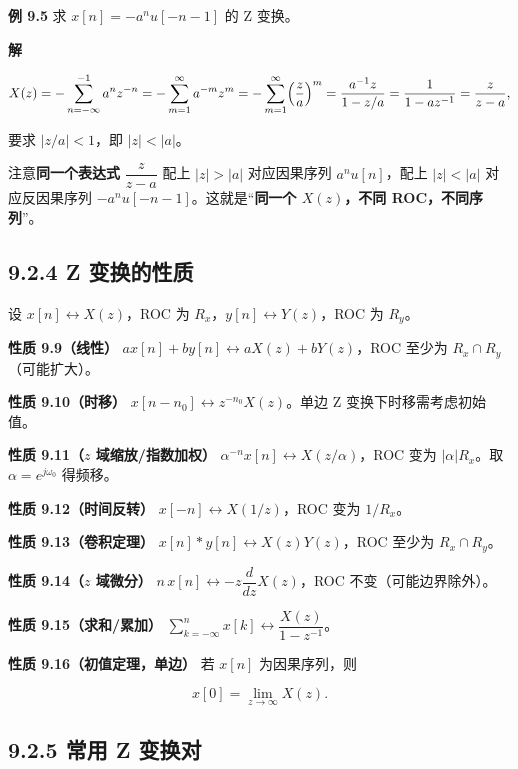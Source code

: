 \textbf{例 9.5} 求 \(x[n]=-a^n u[-n-1]\) 的 Z 变换。

\textbf{解}

\[
X(z)=-\sum_{n=-\infty}^{-1}a^n z^{-n}
=-\sum_{m=1}^{\infty} a^{-m}z^{m}
=-\sum_{m=1}^{\infty}\Bigl(\frac{z}{a}\Bigr)^{m}
= \frac{a^{-1}z}{1-z/a} = \frac{1}{1-a z^{-1}} =
\frac{z}{z-a},
\]

要求 \(|z/a|<1\)，即 \(|z|<|a|\)。

注意\textbf{同一个表达式} \(\dfrac{z}{z-a}\) 配上 \(|z|>|a|\)
对应因果序列 \(a^n u[n]\)，配上 \(|z|<|a|\) 对应反因果序列
\(-a^n u[-n-1]\)。这就是``\textbf{同一个 \(X(z)\)，不同
ROC，不同序列}''。

\subsection{9.2.4 Z 变换的性质}\label{z-ux53d8ux6362ux7684ux6027ux8d28}

设 \(x[n]\leftrightarrow X(z)\)，ROC 为
\(R_x\)，\(y[n]\leftrightarrow Y(z)\)，ROC 为 \(R_y\)。

\textbf{性质 9.9（线性）}
\(a x[n]+b y[n]\leftrightarrow a X(z)+b Y(z)\)，ROC 至少为
\(R_x\cap R_y\)（可能扩大）。

\textbf{性质 9.10（时移）}
\(x[n-n_0]\leftrightarrow z^{-n_0}X(z)\)。单边 Z
变换下时移需考虑初始值。

\textbf{性质 9.11（\(z\) 域缩放/指数加权）}
\(\alpha^{-n}x[n]\leftrightarrow X(z/\alpha)\)，ROC 变为
\(|\alpha|R_x\)。取 \(\alpha=e^{j\omega_0}\) 得频移。

\textbf{性质 9.12（时间反转）} \(x[-n]\leftrightarrow X(1/z)\)，ROC 变为
\(1/R_x\)。

\textbf{性质 9.13（卷积定理）}
\(x[n]*y[n]\leftrightarrow X(z)Y(z)\)，ROC 至少为 \(R_x\cap R_y\)。

\textbf{性质 9.14（\(z\) 域微分）}
\(n\,x[n]\leftrightarrow -z\dfrac{d}{dz}X(z)\)，ROC
不变（可能边界除外）。

\textbf{性质 9.15（求和/累加）}
\(\sum_{k=-\infty}^{n}x[k]\leftrightarrow \dfrac{X(z)}{1-z^{-1}}\)。

\textbf{性质 9.16（初值定理，单边）} 若 \(x[n]\) 为因果序列，则

\[
x[0]=\lim_{z\to\infty} X(z).
\]

\subsection{9.2.5 常用 Z
变换对}\label{ux5e38ux7528-z-ux53d8ux6362ux5bf9}

